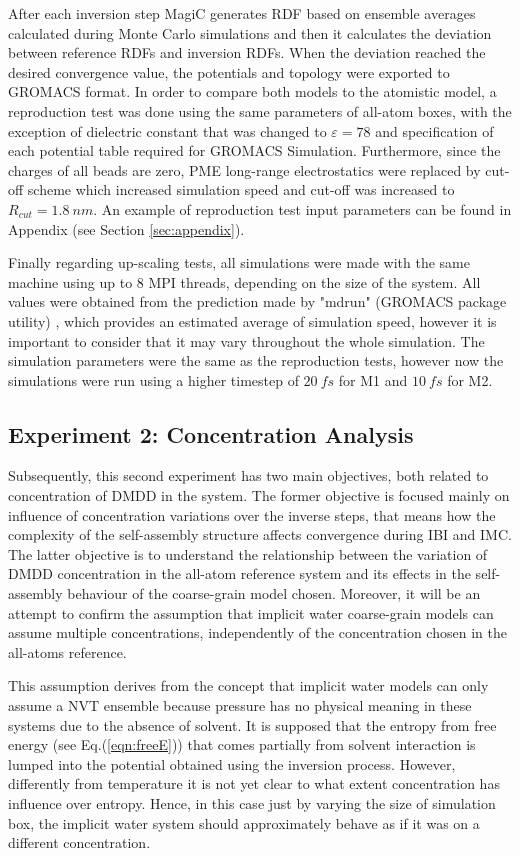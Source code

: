 \documentclass[10pt,a4paper,twoside]{article}
\begin{document}
 After each inversion step MagiC generates RDF based on ensemble averages calculated during Monte Carlo simulations and then it calculates the deviation between reference RDFs and inversion RDFs. When the deviation reached the desired convergence value, the potentials and topology were exported to GROMACS format. In order to compare both models to the atomistic model, a reproduction test was done using the same parameters of all-atom boxes, with the exception of dielectric constant that was changed to $\varepsilon = 78$ and specification of each potential table required for GROMACS Simulation. Furthermore, since the charges of all beads are zero, PME long-range electrostatics were replaced by cut-off scheme which increased simulation speed and cut-off was increased to $R_{cut} = 1.8 \ nm$. An example of reproduction test input parameters can be found in Appendix (see Section \ref{sec:appendix}).
 
 Finally regarding up-scaling tests, all simulations were made with the same machine using up to 8 MPI threads, depending on the size of the system. All values were obtained from the prediction made by "mdrun" (GROMACS package utility) \cite{gromanual}, which provides an estimated average of simulation speed, however it is important to consider that it may vary throughout the whole simulation. The simulation parameters were the same as the reproduction tests, however now the simulations were run using a higher timestep of $20\ fs$ for M1 and $10\ fs$ for M2. 

\subsection{Experiment 2: Concentration Analysis}
 Subsequently, this second experiment has two main objectives, both related to concentration of DMDD in the system. The former objective is focused mainly on influence of concentration variations over the inverse steps, that means how the complexity of the self-assembly 
 structure affects convergence during IBI and IMC. The latter objective is to understand the relationship between the variation of DMDD concentration in the all-atom reference system and its effects in the self-assembly behaviour of the coarse-grain model chosen. Moreover, it will be an attempt to confirm the assumption that implicit water coarse-grain models can assume multiple concentrations, independently of the concentration chosen in the all-atoms reference.
 
 This assumption derives from the concept that implicit water models can only assume a NVT ensemble because pressure has no physical meaning in these systems due to the absence of solvent. It is supposed that the entropy from free energy (see Eq.(\ref{eqn:freeE})) that comes partially from solvent interaction is lumped into the potential obtained using the inversion process. However,   differently from temperature it is not yet clear to what extent concentration has influence over entropy. Hence, in this case just by varying the size of simulation box, the implicit water system should approximately behave as if it was on a different concentration.
  
\end{document}
